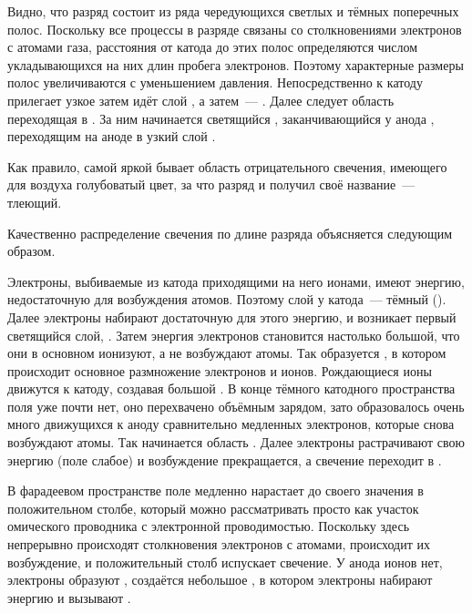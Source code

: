Видно, что разряд состоит из ряда чередующихся светлых и тёмных поперечных полос. Поскольку все процессы в разряде
связаны со столкновениями электронов с атомами газа, расстояния от катода до этих полос определяются числом
укладывающихся на них длин пробега электронов. Поэтому характерные размеры полос увеличиваются с уменьшением давления.
Непосредственно к катоду прилегает узкое  затем идёт слой , а
затем~--- . Далее следует область  переходящая в
. За ним начинается светящийся , заканчивающийся у анода
, переходящим на аноде в узкий слой .

Как правило, самой яркой бывает область отрицательного свечения, имеющего для воздуха голубоватый цвет, за что разряд и
получил своё название~--- тлеющий.

Качественно распределение свечения по длине разряда объясняется следующим образом.

Электроны, выбиваемые из катода приходящими на него ионами, имеют энергию, недостаточную для возбуждения атомов. Поэтому
слой у катода~--- тёмный (). Далее электроны набирают достаточную для этого энергию, и
возникает первый светящийся слой, . Затем энергия электронов становится настолько большой, что
они в основном ионизуют, а не возбуждают атомы. Так образуется , в котором происходит
основное размножение электронов и ионов. Рождающиеся ионы движутся к катоду, создавая большой . В конце тёмного катодного пространства поля уже почти нет, оно перехвачено объёмным зарядом, зато
образовалось очень много движущихся к аноду сравнительно медленных электронов, которые снова возбуждают атомы. Так
начинается область . Далее электроны растрачивают свою энергию (поле слабое) и возбуждение
прекращается, а свечение переходит в .

В фарадеевом пространстве поле медленно нарастает до своего значения в положительном столбе, который можно рассматривать
просто как участок омического проводника с электронной проводимостью. Поскольку здесь непрерывно происходят столкновения
электронов с атомами, происходит их возбуждение, и положительный столб испускает свечение. У анода ионов нет, электроны
образуют , создаётся небольшое , в котором электроны
набирают энергию и вызывают .

